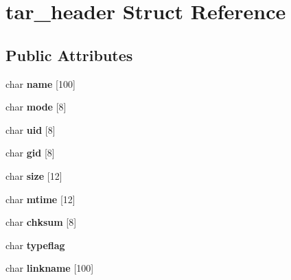 \hypertarget{structtar__header}{}\section{tar\+\_\+header Struct Reference}
\label{structtar__header}
\subsection*{Public Attributes}
\begin{DoxyCompactItemize}
\item 
\mbox{\label{structtar__header_a0cdc11ed3f69f39fceb3cc07b2986ab0}} 
char {\bfseries name} \mbox{[}100\mbox{]}
\item 
\mbox{\label{structtar__header_a26a170f4d3c7f740ab98f95195bdd051}} 
char {\bfseries mode} \mbox{[}8\mbox{]}
\item 
\mbox{\label{structtar__header_ac8b90b2b679751fad5eae5f22241c3ea}} 
char {\bfseries uid} \mbox{[}8\mbox{]}
\item 
\mbox{\label{structtar__header_ab57ccb03527c1b3e7a04743554238a03}} 
char {\bfseries gid} \mbox{[}8\mbox{]}
\item 
\mbox{\label{structtar__header_ac732f3d337436056ff6b3ab897907b06}} 
char {\bfseries size} \mbox{[}12\mbox{]}
\item 
\mbox{\label{structtar__header_a47897e3cd679fb29f6288f19c54b87ce}} 
char {\bfseries mtime} \mbox{[}12\mbox{]}
\item 
\mbox{\label{structtar__header_abe1456aee5147c584de72b620467d9be}} 
char {\bfseries chksum} \mbox{[}8\mbox{]}
\item 
\mbox{\label{structtar__header_a8a9662777f906b3a4289881d49a4602c}} 
char {\bfseries typeflag}
\item 
\mbox{\label{structtar__header_a6320fbdf719741f181420215d53152f6}} 
char {\bfseries linkname} \mbox{[}100\mbox{]}
\item 
\mbox{\label{structtar__header_a31ab56a49bb644dbb11d82854ab4cad0}} 

\end{DoxyCompactItemize}
